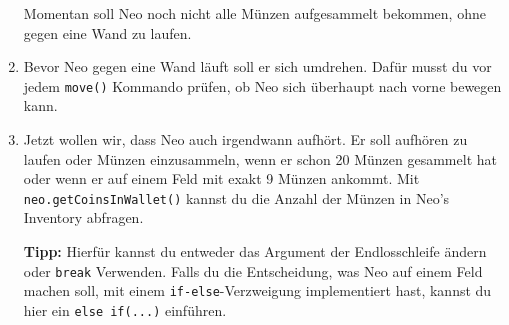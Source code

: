 \begin{enumerate}
		Momentan soll Neo noch nicht alle Münzen aufgesammelt bekommen, ohne gegen eine Wand zu laufen.

	\item
		Bevor Neo gegen eine Wand läuft soll er sich umdrehen.
		Dafür musst du vor jedem \lstinline{move()} Kommando prüfen, ob Neo sich überhaupt nach vorne bewegen kann.

	\item
		Jetzt wollen wir, dass Neo auch irgendwann aufhört.
		Er soll aufhören zu laufen oder Münzen einzusammeln, wenn er schon 20 Münzen gesammelt hat oder wenn er auf einem Feld mit exakt 9 Münzen ankommt.
		Mit \lstinline{neo.getCoinsInWallet()} kannst du die Anzahl der Münzen in Neo's Inventory abfragen.

		\textbf{Tipp:} Hierfür kannst du entweder das Argument der Endlosschleife ändern oder \lstinline{break} Verwenden.
		Falls du die Entscheidung, was Neo auf einem Feld machen soll, mit einem \lstinline{if-else}-Verzweigung implementiert hast, kannst du hier ein \lstinline{else if(...)} einführen.
\end{enumerate}
